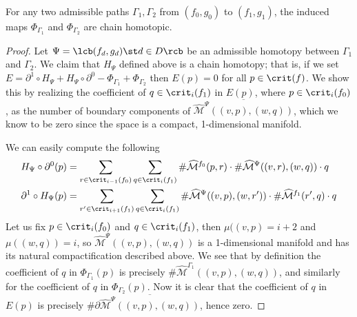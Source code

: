 \begin{prop}
\label{induced maps of homotopic paths are homotopic}
For any two admissible paths $\Gamma_1,\Gamma_2$ from $(f_0,g_0)$ to $(f_1,g_1)$, the induced maps $\Phi_{\Gamma_1}$ and $\Phi_{\Gamma_2}$ are chain homotopic.
\end{prop}
\begin{proof}
Let $\Psi = \lcb (f_d,g_d) \st d \in D \rcb$ be an admissible homotopy between $\Gamma_1$ and $\Gamma_2$. We claim that $H_\Psi$ defined above is a chain homotopy; that is, if we set $E=\partial^1 \circ H_\Psi + H_\Psi \circ \partial^0 - \Phi_{\Gamma_1} + \Phi_{\Gamma_2}$ then $E(p)=0$ for all $p \in \crit(f)$. We show this by realizing the coefficient of $q \in \crit_i(f_1)$ in $E(p)$, where $p \in \crit_i(f_0)$, as the number of boundary components of $\overline{\widehat{\mathcal M}^\Psi((v,p),(w,q))}$, which we know to be zero since the space is a compact, 1-dimensional manifold.

We can easily compute the following
\begin{align*}
H_\Psi \circ \partial^0(p) &= \sum_{r \in \crit_{i-1}(f_0)} \sum_{q \in \crit_i(f_1)} \# \widehat{\mathcal M}^{f_0}(p,r) \cdot \# \widehat{\mathcal M}^\Psi((v,r),(w,q)) \cdot q \\
\partial^1 \circ H_\Psi(p) &= \sum_{r' \in \crit_{i+1}(f_1)} \sum_{q \in \crit_i(f_1)} \# \widehat{\mathcal M}^\Psi((v,p),(w,r')) \cdot \# \widehat{\mathcal M}^{f_1}(r',q) \cdot q 
\end{align*}
Let us fix $p \in \crit_i(f_0)$ and $q \in \crit_i(f_1)$, then $\mu((v,p)=i+2$ and $\mu((w,q))=i$, so $\widehat{\mathcal M}^\Psi((v,p),(w,q))$ is a 1-dimensional manifold and has its natural compactification described above. We see that by definition the coefficient of $q$ in $\Phi_{\Gamma_1}(p)$ is precisely $\#\widehat{\mathcal M}^{\Gamma_1}((v,p),(w,q))$, and similarly for the coefficient of $q$ in $\Phi_{\Gamma_2}(p)$. Now it is clear that the coefficient of $q$ in $E(p)$ is precisely $\# \partial \overline{\widehat{\mathcal M}^\Psi((v,p),(w,q))}$, hence zero.


\end{proof}
